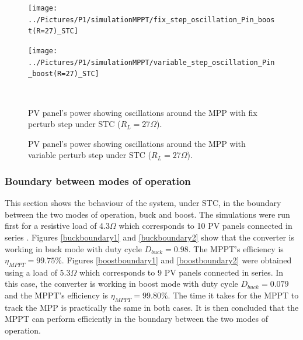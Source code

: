 \vspace{1cm}
\begin{figure}[H]
	\begin{minipage}[c]{0.5\textwidth}
		\centering
		\texttt{[image: ../Pictures/P1/simulationMPPT/fix\_step\_oscillation\_Pin\_boost(R=27)\_STC]} %
	\end{minipage}%
	\hfill
	\begin{minipage}[c]{0.5\textwidth}
		\centering
		\texttt{[image: ../Pictures/P1/simulationMPPT/variable\_step\_oscillation\_Pin\_boost(R=27)\_STC]} %
	\end{minipage} \\ %
	\begin{minipage}[t]{0.45\textwidth}
		\caption{PV panel's power showing oscillations around the MPP with fix perturb step under STC ($R_{L}=27\Omega$).} %
		\label{boostoscillationfix}
	\end{minipage}%
	\hfill
	\begin{minipage}[t]{0.45\textwidth}
		\caption{PV panel's power showing oscillations around the MPP with variable perturb step under STC ($R_{L}=27\Omega$).} %
		\label{boostoscillationvar}
	\end{minipage}
\end{figure}

\subsubsection*{Boundary between modes of operation}


This section shows the behaviour of the system, under STC, in the boundary between the two modes of operation, buck and boost. The simulations were run first for a resistive load of 4.3$\Omega$ which corresponds to 10 PV panels connected in series . Figures \ref{buckboundary1} and \ref{buckboundary2} show that the converter is working in buck mode with duty cycle $D_{buck}=0.98$. The MPPT's efficiency is $\eta_{MPPT} = 99.75\% $. Figures \ref{boostboundary1} and \ref{boostboundary2} were obtained using a load of 5.3$\Omega$ which corresponds to 9 PV panels connected in series. In this case, the converter is working in boost mode with duty cycle $D_{buck}=0.079$ and the MPPT's efficiency is $\eta_{MPPT} = 99.80\% $. The time it takes for the MPPT to track the MPP is practically the same in both cases. It is then concluded that the MPPT can perform efficiently in the boundary between the two modes of operation.


